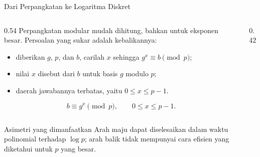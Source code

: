 \documentclass[aspectratio=169,11pt]{beamer}
\begin{document}
\begin{frame}{Dari Perpangkatan ke Logaritma Diskret}
    \begin{columns}[T,onlytextwidth]
        \begin{column}{0.54\textwidth}
            \footnotesize
            Perpangkatan modular mudah dihitung, bahkan untuk eksponen besar.
            Persoalan yang sukar adalah kebalikannya:
            \begin{itemize}
                \item diberikan $g$, $p$, dan $b$, carilah $x$ sehingga
                      $g^{x} \equiv b \pmod p$;
                \item nilai $x$ disebut  dari $b$
                      untuk basis $g$ modulo $p$;
                \item daerah jawabannya terbatas, yaitu $0 \le x \le p-1$.
            \end{itemize}
            \[
                b \equiv g^{x} \pmod p, \qquad 0 \le x \le p-1 .
            \]
        \end{column}
        \begin{column}{0.42\textwidth}
            \centering
        \end{column}
    \end{columns}
    \vspace{0.1cm}
    \begin{alertblock}{Asimetri yang dimanfaatkan}
        \footnotesize
        Arah maju dapat diselesaikan dalam waktu polinomial terhadap
        $\log p$; arah balik tidak mempunyai cara efisien yang diketahui
        untuk $p$ yang besar.
    \end{alertblock}
\end{frame}
\end{document}
